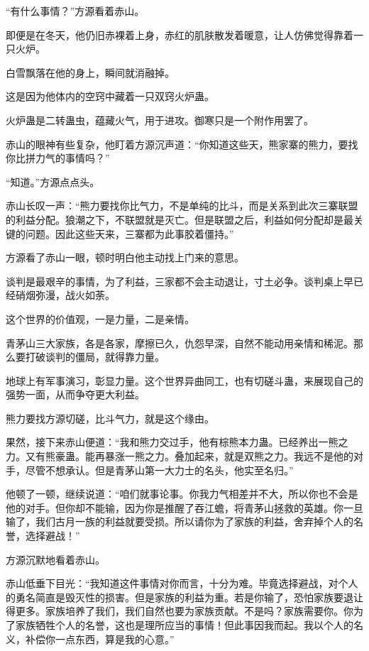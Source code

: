 
\begin{this_body}

“有什么事情？”方源看着赤山。

即便是在冬天，他仍旧赤裸着上身，赤红的肌肤散发着暖意，让人仿佛觉得靠着一只火炉。

白雪飘落在他的身上，瞬间就消融掉。

这是因为他体内的空窍中藏着一只双窍火炉蛊。

火炉蛊是二转蛊虫，蕴藏火气，用于进攻。御寒只是一个附作用罢了。

赤山的眼神有些复杂，他盯着方源沉声道：“你知道这些天，熊家寨的熊力，要找你比拼力气的事情吗？”

“知道。”方源点点头。

赤山长叹一声：“熊力要找你比气力，不是单纯的比斗，而是关系到此次三寨联盟的利益分配。狼潮之下，不联盟就是灭亡。但是联盟之后，利益如何分配却是最关键的问题。因此这些天来，三寨都为此事胶着僵持。”

方源看了赤山一眼，顿时明白他主动找上门来的意思。

谈判是最艰辛的事情，为了利益，三家都不会主动退让，寸土必争。谈判桌上早已经硝烟弥漫，战火如荼。

这个世界的价值观，一是力量，二是亲情。

青茅山三大家族，各是各家，摩擦已久，仇怨早深，自然不能动用亲情和稀泥。那么要打破谈判的僵局，就得靠力量。

地球上有军事演习，彰显力量。这个世界异曲同工，也有切磋斗蛊，来展现自己的强势一面，从而争夺更大利益。

熊力要找方源切磋，比斗气力，就是这个缘由。

果然，接下来赤山便道：“我和熊力交过手，他有棕熊本力蛊。已经养出一熊之力。又有熊豪蛊。能再暴涨一熊之力。叠加起来，就是双熊之力。我远不是他的对手，尽管不想承认。但是青茅山第一大力士的名头，他实至名归。”

他顿了一顿，继续说道：“咱们就事论事。你我力气相差并不大，所以你也不会是他的对手。但你却不能输，因为你是推醒了吞江蟾，将青茅山拯救的英雄。你一旦输了，我们古月一族的利益就要受损。所以请你为了家族的利益，舍弃掉个人的名誉，选择避战！”

方源沉默地看着赤山。

赤山低垂下目光：“我知道这件事情对你而言，十分为难。毕竟选择避战，对个人的勇名简直是毁灭性的损害。但是家族的利益为重。若是你输了，恐怕家族要退让得更多。家族培养了我们，我们自然也要为家族贡献。不是吗？家族需要你。你为了家族牺牲个人的名誉，这也是理所应当的事情！但此事因我而起。我以个人的名义，补偿你一点东西，算是我的心意。”


\end{this_body}
